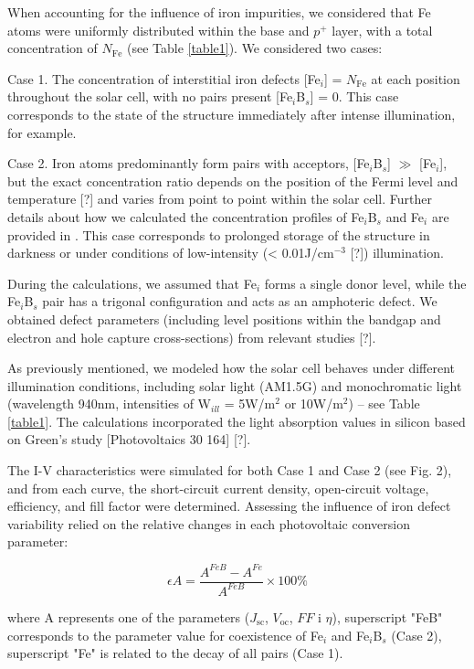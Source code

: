 \documentclass[a4paper,fleqn]{cas-sc}
\begin{document}
When accounting for the influence of iron impurities, we considered that Fe atoms were uniformly distributed within the base and $p^+$ layer, with a total concentration of $N$$\mathrm{_{Fe}}$ (see Table \ref{table1}). We considered two cases:


Case 1. The concentration of interstitial iron defects [Fe$_i$] = $N$$\mathrm{_{Fe}}$  at each position throughout the solar cell, with no pairs present [Fe$_i$B$_s$] = 0. This case corresponds to the state of the structure immediately after intense illumination, for example.


Case 2.  Iron atoms predominantly form pairs with acceptors, [Fe$_i$B$_s$] $\gg$ [Fe$_i$], but the exact concentration ratio depends on the position of the Fermi level and temperature [?] and varies from point to point within the solar cell. Further details about how we calculated the concentration profiles of Fe$_i$B$_s$ and Fe$_i$ are provided in \cite{PratapSingh2019}. This case corresponds to prolonged storage of the structure in darkness or under conditions of low-intensity (< 0.01J/$\mathrm{cm}^{-3}$ [?]) illumination.


During the calculations, we assumed that Fe$_i$ forms a single donor level, while the Fe$_i$B$_s$ pair has a trigonal configuration and acts as an amphoteric defect. We obtained defect parameters (including level positions within the bandgap and electron and hole capture cross-sections) from relevant studies [?].


As previously mentioned, we modeled how the solar cell behaves under different illumination conditions, including solar light (AM1.5G) and monochromatic light (wavelength 940nm, intensities of W$_{ill}$ = 5W/$\mathrm{m}^{2}$ or 10W/$\mathrm{m}^{2}$) – see Table \ref{table1}. The calculations incorporated the light absorption values in silicon based on Green's study [Photovoltaics 30 164] [?].


The I-V characteristics were simulated for both Case 1 and Case 2 (see Fig. 2), and from each curve, the short-circuit current density, open-circuit voltage, efficiency, and fill factor were determined. Assessing the influence of iron defect variability relied on the relative changes in each photovoltaic conversion parameter:

\begin{equation}
    \epsilon A = \frac{A^{FeB} - A^{Fe}}{A^{FeB}} \times 100 \%
\end{equation}

where A represents one of the parameters ($J$$\mathrm{_{sc}}$, $V$$\mathrm{_{oc}}$, $FF$ i $\eta$), superscript "FeB" corresponds to the parameter value for coexistence of Fe$_i$ and Fe$_i$B$_s$ (Case 2), superscript "Fe" is related to the decay of all pairs (Case 1).
\end{document}
